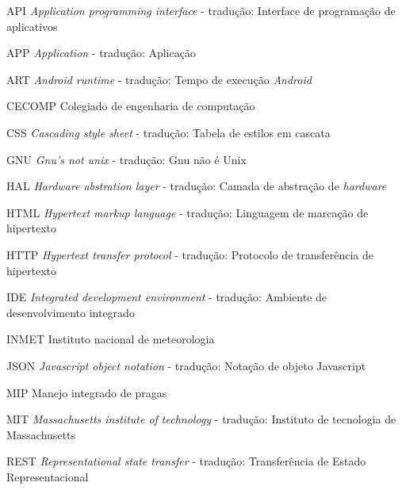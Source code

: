 \begin{KeepFromToc}
\listoffigures
\cleardoublepage


\listoftables
\cleardoublepage


\listoflistings

\end{KeepFromToc}
\begin{siglas}
	\item[API]      \textit{Application programming interface} - tradução: Interface de programação de aplicativos
    \item[APP]		\textit{Application} - tradução: Aplicação
	\item[ART]      \textit{Android runtime} - tradução: Tempo de execução \textit{Android}
	\item[CECOMP]	Colegiado de engenharia de computação
	\item[CSS]      \textit{Cascading style sheet} - tradução: Tabela de estilos em cascata
    \item[GNU]		\textit{Gnu's not unix} - tradução: Gnu não é Unix
	\item[HAL]      \textit{Hardware abstration layer} - tradução: Camada de abstração de \textit{hardware} 
	\item[HTML]     \textit{Hypertext markup language} - tradução: Linguagem  de marcação de hipertexto
	\item[HTTP]     \textit{Hypertext transfer protocol} - tradução: Protocolo de transferência de hipertexto
	\item[IDE]      \textit{Integrated development environment} - tradução: Ambiente de desenvolvimento integrado
	\item[INMET]	Instituto nacional de meteorologia
    \item[JSON]	    \textit{Javascript object notation} - tradução: Notação de objeto Javascript
	\item[MIP]      Manejo integrado de pragas
    \item[MIT]		\textit{Massachusetts institute of technology} - tradução: Instituto de tecnologia de Massachusetts
	\item[REST]     \textit{Representational state transfer} - tradução: Transferência de Estado Representacional

\end{siglas}
